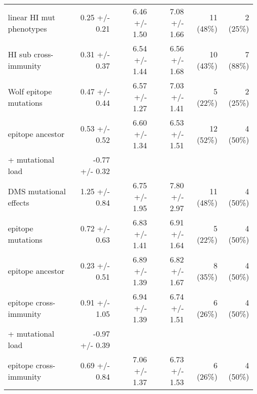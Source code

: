 \begin{tabular*}{1.05\textwidth}{lrrrrr}
linear HI mut phenotypes & 0.25 +/- 0.21 & 6.46 +/- 1.50 & 7.08 +/- 1.66 & 11 (48\%) & 2 (25\%) \\
HI sub cross-immunity & 0.31 +/- 0.37 & 6.54 +/- 1.44 & 6.56 +/- 1.68 & 10 (43\%) & 7 (88\%) \\
Wolf epitope mutations & 0.47 +/- 0.44 & 6.57 +/- 1.27 & 7.03 +/- 1.41 & 5 (22\%) & 2 (25\%) \\
epitope ancestor & 0.53 +/- 0.52 & 6.60 +/- 1.34 & 6.53 +/- 1.51 & 12 (52\%) & 4 (50\%) \\
\hspace{5mm} + mutational load & -0.77 +/- 0.32 & & & & \\
DMS mutational effects & 1.25 +/- 0.84 & 6.75 +/- 1.95 & 7.80 +/- 2.97 & 11 (48\%) & 4 (50\%) \\
epitope mutations & 0.72 +/- 0.63 & 6.83 +/- 1.41 & 6.91 +/- 1.64 & 5 (22\%) & 4 (50\%) \\
epitope ancestor & 0.23 +/- 0.51 & 6.89 +/- 1.39 & 6.82 +/- 1.67 & 8 (35\%) & 4 (50\%) \\
epitope cross-immunity & 0.91 +/- 1.05 & 6.94 +/- 1.39 & 6.74 +/- 1.51 & 6 (26\%) & 4 (50\%) \\
\hspace{5mm} + mutational load & -0.97 +/- 0.39 & & & & \\
epitope cross-immunity & 0.69 +/- 0.84 & 7.06 +/- 1.37 & 6.73 +/- 1.53 & 6 (26\%) & 4 (50\%) \\

\bottomrule
\end{tabular*}
